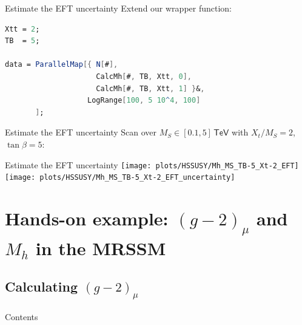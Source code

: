 \documentclass[hyperref={pdfpagelabels=false},ngerman]{beamer}
\newcommand{\eh}[1]{\,\mathsf{#1}}
\newcommand{\MS}{\ensuremath{M_S}}
\begin{document}
\begin{frame}{Estimate the EFT uncertainty}
  Extend our wrapper function:\\[2em]
  \usebox{\listbox}
\end{frame}

\begin{lrbox}{\listbox}\begin{lstlisting}[language=Mathematica]
Xtt = 2;
TB  = 5;

data = ParallelMap[{ N[#],
                     CalcMh[#, TB, Xtt, 0],
                     CalcMh[#, TB, Xtt, 1] }&,
                   LogRange[100, 5 10^4, 100]
       ];
\end{lstlisting}\end{lrbox} %

\begin{frame}{Estimate the EFT uncertainty}
  Scan over $\MS \in [0.1, 5]\eh{TeV}$ with $X_t/\MS = 2$, $\tan\beta = 5$:\\[2em]
  \usebox{\listbox}
\end{frame}

\begin{frame}{Estimate the EFT uncertainty}
  \texttt{[image: plots/HSSUSY/Mh\_MS\_TB-5\_Xt-2\_EFT]}\hfill
  \texttt{[image: plots/HSSUSY/Mh\_MS\_TB-5\_Xt-2\_EFT\_uncertainty]}
\end{frame}

\section{Hands-on example: $(g-2)_\mu$ and $M_h$ in the MRSSM}
\subsection{Calculating $(g-2)_\mu$}

\begin{frame}{Contents}
  \tableofcontents[currentsubsection,sectionstyle=show/shaded]  
\end{frame}
\end{document}

